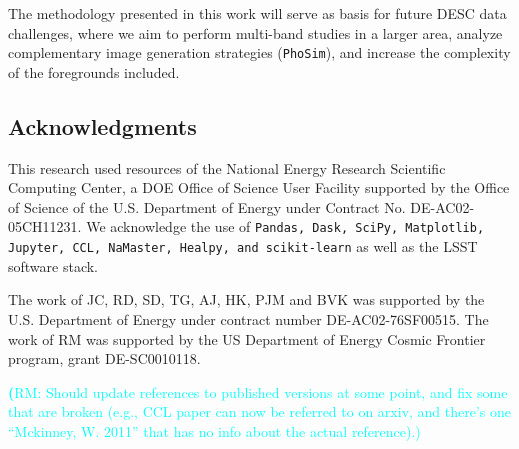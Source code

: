 \documentclass[twocolumn]{aastex62}
\newcommand{\rachel}[1]{{\textcolor{cyan}{{\textbf (RM: #1)}}}}
\begin{document}
The methodology presented in this work will serve as basis for future DESC data challenges, where we aim to perform multi-band studies in a larger area, analyze complementary image generation strategies (\texttt{PhoSim}), and increase the complexity of the foregrounds included.


\subsection*{Acknowledgments}

This research used resources of the National Energy Research Scientific Computing Center, a DOE Office of Science User Facility supported by the Office of Science of the U.S. Department of Energy under Contract No. DE-AC02-05CH11231. We acknowledge the use of \texttt{Pandas, Dask, SciPy, Matplotlib, Jupyter, CCL, NaMaster, Healpy, and scikit-learn} as well as the LSST software stack.

The work of JC, RD, SD, TG, AJ, HK, PJM and BVK was supported by the U.S. Department of Energy under contract number DE-AC02-76SF00515. 
The work of RM was supported by the US Department of Energy Cosmic Frontier program, grant DE-SC0010118.



\rachel{Should update references to published versions at some point, and fix some that are broken (e.g., CCL paper can now be referred to on arxiv, and there's one ``Mckinney, W. 2011'' that has no info about the actual reference).}




\appendix
\end{document}
